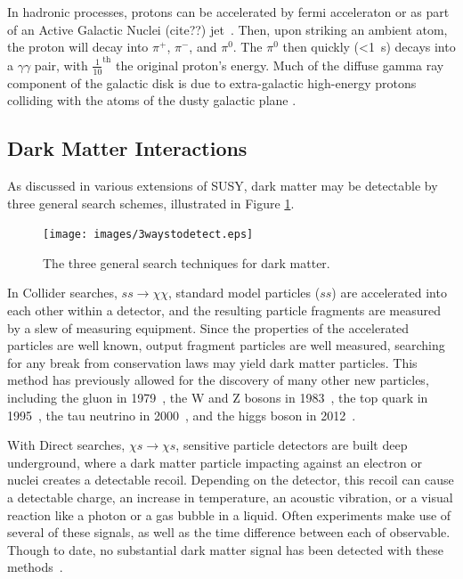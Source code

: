   In hadronic processes, protons can be accelerated by fermi acceleraton or as part of an {\color{red}Active Galactic Nuclei (cite??)} jet~\cite{hadronic1,hadronic2}.
  Then, upon striking an ambient atom, the proton will decay into $\pi^{+}$, $\pi^{-}$, and $\pi^{0}$.
  The $\pi^{0}$ then quickly (<\SI{1}{s}) decays into a $\gamma\gamma$ pair, with \nicetilde $\frac{1}{10}^{\text{th}}$ the original proton's energy.
  Much of the diffuse gamma ray component of the galactic disk is due to extra-galactic high-energy protons colliding with the atoms of the dusty galactic plane \cite{GalacticDiffuseGammaRays}.

  \subsection{Dark Matter Interactions}\label{dmgammaproduction}
    As discussed in various extensions of SUSY, dark matter may be detectable by three general search schemes, illustrated in Figure \ref{fig:3_searches}.

    \begin{figure}[ht]
      \centering
      \texttt{[image: images/3waystodetect.eps]}
      \caption[3 Search Techniques]{
        The three general search techniques for dark matter.}
      \label{fig:3_searches}
    \end{figure}

    In Collider searches, $ss \rightarrow \chi\chi$, standard model particles ($ss$) are accelerated into each other within a detector, and the resulting particle fragments are measured by a slew of measuring equipment.
    Since the properties of the accelerated particles are well known, output fragment particles are well measured, searching for any break from conservation laws may yield dark matter particles.
    This method has previously allowed for the discovery of many other new particles, including the gluon in 1979~\cite{gluon_discovery}, the W and Z bosons in 1983~\cite{WZ_discovery1,WZ_discovery2}, the top quark in 1995~\cite{top_discovery}, the tau neutrino in 2000~\cite{tau_neutrino_discovery}, and the higgs boson in 2012~\cite{Higgs_ATLAS,Higgs_CMS}.

    With Direct searches, $\chi s \rightarrow \chi s$, sensitive particle detectors are built deep underground, where a dark matter particle impacting against an electron or nuclei creates a detectable recoil.
    Depending on the detector, this recoil can cause a detectable charge, an increase in temperature, an acoustic vibration, or a visual reaction like a photon or a gas bubble in a liquid.
    Often experiments make use of several of these signals, as well as the time difference between each of observable.
    Though to date, no substantial dark matter signal has been detected with these methods~\cite{direct_dm_detection}.

